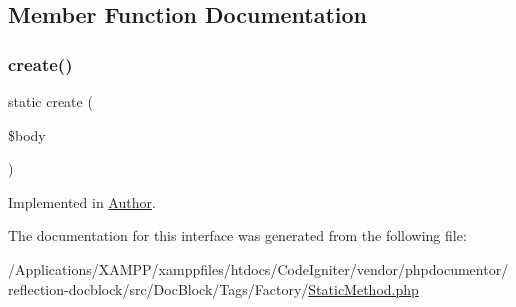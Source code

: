 \subsection{Member Function Documentation}
\mbox{\label{interfacephp_documentor_1_1_reflection_1_1_doc_block_1_1_tags_1_1_factory_1_1_static_method_a322bfa4cad4fbe7364f4ab65c8f8588c}} 
\subsubsection{\texorpdfstring{create()}{create()}}
{\footnotesize\ttfamily static create (\begin{DoxyParamCaption}\item[{}]{\$body }\end{DoxyParamCaption})\hspace{0.3cm}{\ttfamily [static]}}



Implemented in \mbox{\hyperlink{classphp_documentor_1_1_reflection_1_1_doc_block_1_1_tags_1_1_author_a322bfa4cad4fbe7364f4ab65c8f8588c}{Author}}.



The documentation for this interface was generated from the following file\+:\begin{DoxyCompactItemize}
\item 
/\+Applications/\+X\+A\+M\+P\+P/xamppfiles/htdocs/\+Code\+Igniter/vendor/phpdocumentor/reflection-\/docblock/src/\+Doc\+Block/\+Tags/\+Factory/\mbox{\hyperlink{_static_method_8php}{Static\+Method.\+php}}\end{DoxyCompactItemize}
